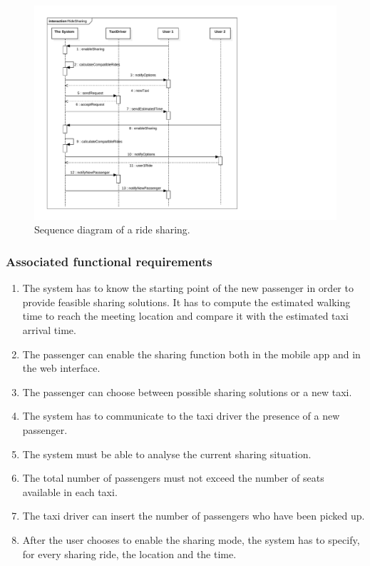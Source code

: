 \begin{figure}
	\includegraphics[width=\textwidth]{diagrams/sequence_ride_sharing.pdf}
	\caption{Sequence diagram of a ride sharing.}
	\label{fig:sequence-sharing}
\end{figure}

\subsubsection{Associated functional requirements}
\begin{enumerate}
\item The system has to know the starting point of the new passenger in order to provide feasible sharing solutions.
It has to compute the estimated walking time to reach the meeting location and compare it with the estimated taxi arrival time.
\item The passenger can enable the sharing function both in the mobile app and in the web interface.
\item The passenger can choose between possible sharing solutions or a new taxi.
\item The system has to communicate to the taxi driver the presence of a new passenger.
\item The system must be able to analyse the current sharing situation. %
\item The total number of passengers must not exceed the number of seats available in each taxi.
\item The taxi driver can insert the number of passengers who have been picked up.
\item After the user chooses to enable the sharing mode, the system has to specify, for every sharing ride, the location and the time.
\end{enumerate}
